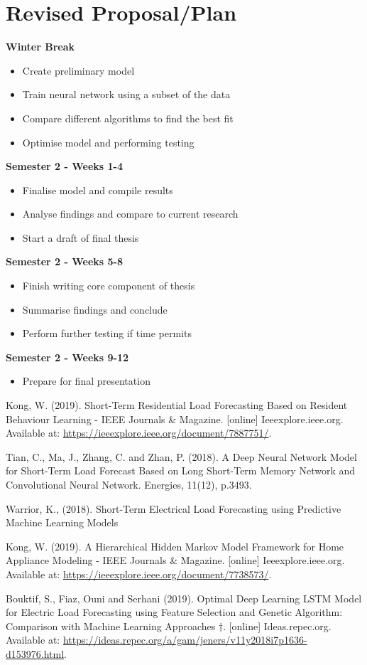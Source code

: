\documentclass[12pt,twocolumn]{article}
\begin{document}
	\section{Revised Proposal/Plan}
		\textbf{Winter Break}
		\begin{itemize}
			\item Create preliminary model
			\item Train neural network using a subset of the data
			\item Compare different algorithms to find the best fit
			\item Optimise model and performing testing
		\end{itemize}
		\textbf{Semester 2 - Weeks 1-4}
		\begin{itemize}
			\item Finalise model and compile results
			\item Analyse findings and compare to current research
			\item Start a draft of final thesis
		\end{itemize}
		\textbf{Semester 2 - Weeks 5-8}
		\begin{itemize}
			\item Finish writing core component of thesis
			\item Summarise findings and conclude
			\item Perform further testing if time permits
		\end{itemize}
		\textbf{Semester 2 - Weeks 9-12}
		\begin{itemize}
			\item Prepare for final presentation
		\end{itemize}

	\begin{thebibliography}{99}
		 Kong, W. (2019). Short-Term Residential Load Forecasting Based on Resident Behaviour Learning - IEEE Journals \& Magazine. [online] Ieeexplore.ieee.org. Available at: \url{https://ieeexplore.ieee.org/document/7887751/}.

		 Tian, C., Ma, J., Zhang, C. and Zhan, P. (2018). A Deep Neural Network Model for Short-Term Load Forecast Based on Long Short-Term Memory Network and Convolutional Neural Network. Energies, 11(12), p.3493.

		 Warrior, K., (2018). Short-Term Electrical Load Forecasting using Predictive Machine Learning Models

		 Kong, W. (2019). A Hierarchical Hidden Markov Model Framework for Home Appliance Modeling - IEEE Journals \& Magazine. [online] Ieeexplore.ieee.org. Available at: \url{https://ieeexplore.ieee.org/document/7738573/}.

		 Bouktif, S., Fiaz, Ouni and Serhani (2019). Optimal Deep Learning LSTM Model for Electric Load Forecasting using Feature Selection and Genetic Algorithm: Comparison with Machine Learning Approaches †. [online] Ideas.repec.org. Available at: \url{https://ideas.repec.org/a/gam/jeners/v11y2018i7p1636-d153976.html}.



	
	\end{thebibliography}
\end{document}
